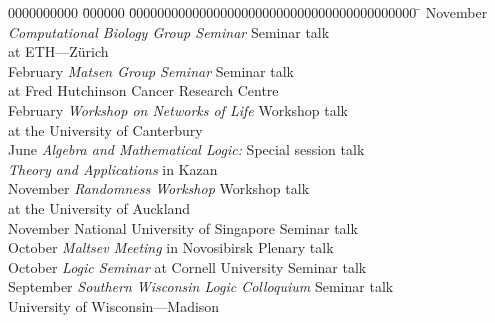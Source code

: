 \documentclass[12pt]{article}
\begin{document}
\iftoggle{full}{
\centerline{\bf Invited Talks}
}{
\centerline{\bf Recent invited talks}
}
\begin{tabbing}
0000000000	\= 000000 \= 00000000000000000000000000000000000000000	\= \kill
November		\> {\em Computational Biology Group Seminar}	\> Seminar talk\\
		\>	\> at ETH---Z\"urich				\> \\
February		\> {\em Matsen Group Seminar}			\> Seminar talk\\
		\>	\> at Fred Hutchinson Cancer Research Centre	\> \\
February		\> {\em Workshop on Networks of Life}		\> Workshop talk\\
		\>	\> at the University of Canterbury		\> \\
June			\> {\em Algebra and Mathematical Logic:}	\> Special session talk\\
		\>	\> {\em Theory and Applications} in Kazan	\> \\
November		\> {\em Randomness Workshop}			\> Workshop talk\\
		\>	\> at the University of Auckland		\> \\
November		\> National University of Singapore		\> Seminar talk\\
\iftoggle{full}{
March		\> 2012	\> Auckland University of Technology		\> Seminar talk\\
}{}
October			\> {\em Maltsev Meeting} in Novosibirsk		\> Plenary talk\\
October			\> {\em Logic Seminar} at Cornell University	\> Seminar talk\\
September		\> {\em Southern Wisconsin Logic Colloquium}	\> Seminar talk\\
		\>	\> University of Wisconsin---Madison		\> \\
\iftoggle{full}{
November	\> 2009	\> {\em Computational Logic Seminar}		\> Seminar talk\\
		\>	\> at CUNY Graduate Centre			\> \\
October		\> 2009	\> {\em Logic Seminar} at Cornell University	\> Seminar talk\\
October		\> 2009	\> {\em Logic Seminar}				\> Seminar talk\\
		\>	\> at the University of Notre Dame		\> \\
November	\> 2007	\> {\em Maltsev Meeting} in Novosibirsk		\> Plenary talk\\
September	\> 2006	\> {\em Algebra and Logic Seminar}		\> Seminar talk\\
		\>	\> at Novosibirsk State University		\> \\
June		\> 2005	\> {\em Joint Seminar on Constructive Models}	\> Seminar talk\\
		\>	\> Notre Dame and Novosibirsk Universities	\> \\
November	\> 2004	\> {\em Algebra and Logic Seminar}		\> Seminar talk\\
		\>	\> at Novosibirsk State University		\> \\
}{}
\end{tabbing}
\end{document}
